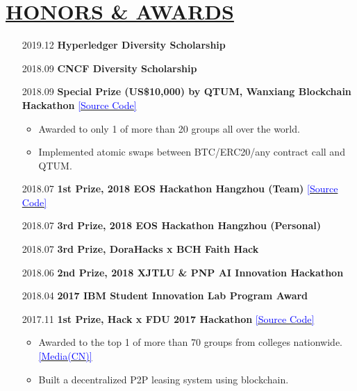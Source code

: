 \documentclass[11pt]{article}
\begin{document}
\section*{\centering\underline{HONORS \& AWARDS}}
\begin{itemize}[noitemsep, nolistsep]
    \item[2019.12]\textbf{Hyperledger Diversity Scholarship}
    \item[2018.09]\textbf{CNCF Diversity Scholarship}
    \item[2018.09]\textbf{Special Prize (US\$10,000) by QTUM, Wanxiang Blockchain Hackathon} \href{https://github.com/PRIEWIENV/QtumSwap}{\textcolor{blue}{[Source Code]}}
        \begin{itemize}[noitemsep, nolistsep]
            \small
            \item Awarded to only 1 of more than 20 groups all over the world. 
            \item Implemented atomic swaps between BTC/ERC20/any contract call and QTUM.
        \end{itemize} 
    \item[2018.07]\textbf{1st Prize, 2018 EOS Hackathon Hangzhou (Team)} \href{https://github.com/Acappella-dream}{\textcolor{blue}{[Source Code]}}
    \item[2018.07]\textbf{3rd Prize, 2018 EOS Hackathon Hangzhou (Personal)}
    \item[2018.07]\textbf{3rd Prize, DoraHacks x BCH Faith Hack}
    \item[2018.06]\textbf{2nd Prize, 2018 XJTLU \& PNP AI Innovation Hackathon}
    \item[2018.04]\textbf{2017 IBM Student Innovation Lab Program Award}
    \item[2017.11]\textbf{1st Prize, Hack x FDU 2017 Hackathon} \href{https://github.com/dexhunter/hackxfdu-DSharing}{\textcolor{blue}{[Source Code]}}
        \begin{itemize}[noitemsep, nolistsep]
            \small
            \item Awarded to the top 1 of more than 70 groups from colleges nationwide. \href{https://archive.is/FzYVh}{\textcolor{blue}{[Media(CN)]}}
            \item Built a decentralized P2P leasing system using blockchain. 
        \end{itemize} 
\end{itemize}



\end{document}
